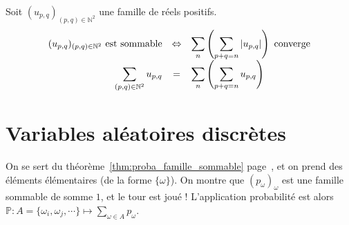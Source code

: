\documentclass[11pt,a4paper,fleqn,pdftex]{report}
\begin{document}
\begin{itheorem}
     Soit $(u_{p,q})_{(p,q)\in \mathbb{N}^2}$ une famille de réels positifs.\newline
     \begin{equation}
          \begin{array}{r c l}
               (u_{p,q})_{(p,q)\in \mathbb{N}^2} \text{ est sommable} & \Leftrightarrow & \displaystyle\sum_n \left( \displaystyle\sum_{p+q = n} |u_{p,q}| \right)\text{ converge} \\
               \displaystyle\sum_{(p,q)\in \mathbb{N}^2} u_{p,q} & = & \displaystyle\sum_n \left( \displaystyle\sum_{p+q = n} u_{p,q} \right) \\
          \end{array}
     \end{equation}
\end{itheorem}
\chapter{Variables aléatoires discrètes} %
\label{cha:variables_aleatoires_discretes}
\begin{methode}
     On se sert du théorème~\ref{thm:proba_famille_sommable} page~\pageref{thm:proba_famille_sommable}, et on prend des éléments élémentaires (de la forme $\lbrace \omega \rbrace$). On montre que $(p_\omega )_{\omega}$ est une famille sommable de somme $1$, et le tour est joué ! L'application probabilité est alors $\mathbb{P} : A= \lbrace \omega_i, \omega_j, \cdots  \rbrace \longmapsto \sum_{\omega\in A} p_\omega$.
\end{methode}
\end{document}
